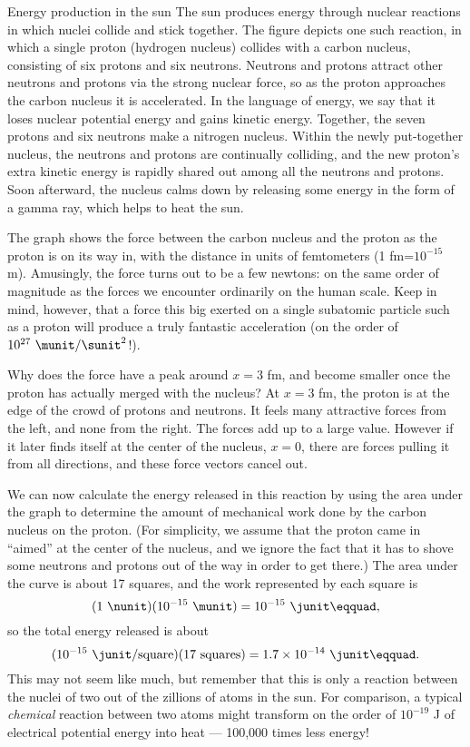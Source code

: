 \begin{eg}{Energy production in the sun}\label{eg:cno-cycle}
The sun produces energy through nuclear reactions in which
nuclei collide and stick together. The figure depicts one
such reaction, in which a single proton (hydrogen nucleus)
collides with a carbon nucleus, consisting of six protons
and six neutrons. Neutrons and protons attract other
neutrons and protons via the strong nuclear force, so as the
proton approaches the carbon nucleus it is accelerated. In
the language of energy, we say that it loses nuclear
potential energy and gains kinetic energy. Together, the
seven protons and six neutrons make a nitrogen nucleus.
Within the newly put-together nucleus, the neutrons and
protons are continually colliding, and the new proton's
extra kinetic energy is rapidly shared out among all the
neutrons and protons. Soon afterward, the nucleus calms down
by releasing some energy in the form of a gamma ray, which
helps to heat the sun.

The graph shows the force between the carbon nucleus and the
proton as the proton is on its way in, with the distance in
units of femtometers (1 fm=$10^{-15}$ m). Amusingly, the
force turns out to be a few newtons: on the same order of
magnitude as the forces we encounter ordinarily on the human
scale. Keep in mind, however, that a force this big exerted
on a single subatomic particle such as a proton will produce
a truly fantastic acceleration (on the order of $10^{27}\ \munit/\sunit^2$!).

Why does the force have a peak around $x=3$ fm, and become
smaller once the proton has actually merged with the
nucleus? At $x=3$ fm, the proton is at the edge of the crowd
of protons and neutrons. It feels many attractive forces
from the left, and none from the right. The forces add up to
a large value. However if it later finds itself at the
center of the nucleus, $x=0$, there are forces pulling it
from all directions, and these force vectors cancel out.

We can now calculate the energy released in this reaction by
using the area under the graph to determine the amount of
mechanical work done by the carbon nucleus on the proton.
(For simplicity, we assume that the proton came in ``aimed''
at the center of the nucleus, and we ignore the fact that it
has to shove some neutrons and protons out of the way in
order to get there.) The area under the curve is about 17
squares, and the work represented by each square is
\begin{equation*}
                (1\ \nunit)(10^{-15}\ \munit)  =  10^{-15}\ \junit\eqquad,
\end{equation*}
so the total energy released is about
\begin{equation*}
                (10^{-15}\ \junit/\text{square})(17\ \text{squares}) =  1.7\times10^{-14}\ \junit\eqquad.
\end{equation*}
This may not seem like much, but remember that this is only
a reaction between the nuclei of two out of the zillions of
atoms in the sun. For comparison, a typical \emph{chemical}
reaction between two atoms might transform on the order of
$10^{-19}$ J of electrical potential energy into heat ---
100,000 times less energy!


\end{eg}
